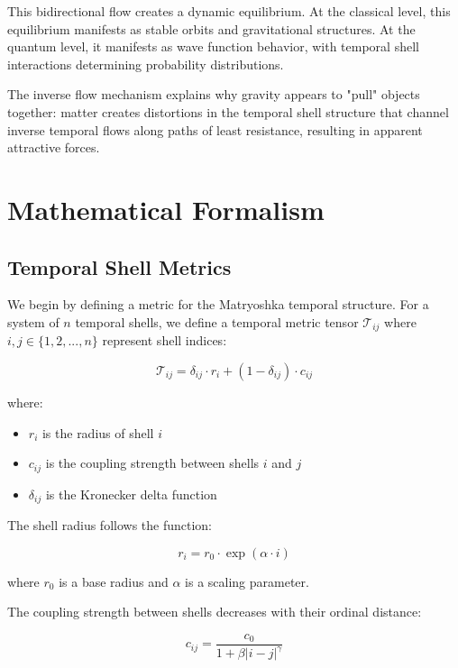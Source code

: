 \documentclass[12pt,a4paper]{article}
\begin{document}
This bidirectional flow creates a dynamic equilibrium. At the classical level, this equilibrium manifests as stable orbits and gravitational structures. At the quantum level, it manifests as wave function behavior, with temporal shell interactions determining probability distributions.

The inverse flow mechanism explains why gravity appears to "pull" objects together: matter creates distortions in the temporal shell structure that channel inverse temporal flows along paths of least resistance, resulting in apparent attractive forces.

\section{Mathematical Formalism}

\subsection{Temporal Shell Metrics}

We begin by defining a metric for the Matryoshka temporal structure. For a system of $n$ temporal shells, we define a temporal metric tensor $\mathcal{T}_{ij}$ where $i,j \in \{1,2,...,n\}$ represent shell indices:

\begin{equation}
\mathcal{T}_{ij} = \delta_{ij} \cdot r_i + (1-\delta_{ij}) \cdot c_{ij}
\end{equation}

where:
\begin{itemize}
    \item $r_i$ is the radius of shell $i$
    \item $c_{ij}$ is the coupling strength between shells $i$ and $j$
    \item $\delta_{ij}$ is the Kronecker delta function
\end{itemize}

The shell radius follows the function:

\begin{equation}
r_i = r_0 \cdot \exp(\alpha \cdot i)
\end{equation}

where $r_0$ is a base radius and $\alpha$ is a scaling parameter.

The coupling strength between shells decreases with their ordinal distance:

\begin{equation}
c_{ij} = \frac{c_0}{1 + \beta |i-j|^\gamma}
\end{equation}
\end{document}
